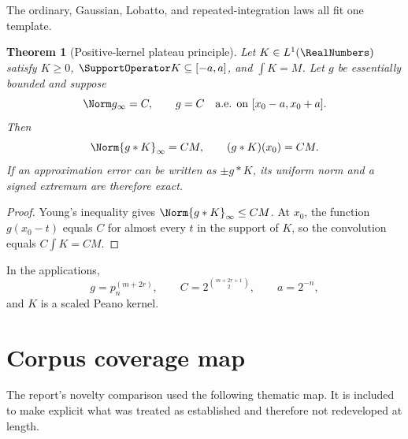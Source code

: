 \documentclass[11pt]{article}
\numberwithin{equation}{section}
\newtheorem{theorem}{Theorem}[section]
\theoremstyle{definition}
\theoremstyle{remark}
\begin{document}
The ordinary, Gaussian, Lobatto, and repeated-integration laws all fit one template.

\begin{theorem}[Positive-kernel plateau principle]
\label{p1:thm:abstract-plateau}
Let $K\in L^1(\RealNumbers)$ satisfy $K\ge0$, $\SupportOperator K\subseteq[-a,a]$, and $\int K=M$.  Let $g$ be essentially bounded and suppose
\[
 \Norm g_\infty=C,
 \qquad
 g=C\quad\text{a.e. on }[x_0-a,x_0+a].
\]
Then
\begin{equation}
 \Norm{g*K}_\infty=CM,
 \qquad
 (g*K)(x_0)=CM.
 \label{p1:eq:abstract-plateau}
\end{equation}
If an approximation error can be written as $\pm g*K$, its uniform norm and a signed extremum are therefore exact.
\end{theorem}

\begin{proof}
Young's inequality gives $\Norm{g*K}_\infty\le CM$.  At $x_0$, the function $g(x_0-t)$ equals $C$ for almost every $t$ in the support of $K$, so the convolution equals $C\int K=CM$.
\end{proof}

In the applications,
\[
 g=p_n^{(m+2r)},
 \qquad
 C=2^{\binom{m+2r+1}{2}},
 \qquad
 a=2^{-n},
\]
and $K$ is a scaled Peano kernel.

\section{Corpus coverage map}
\label{p1:app:coverage}

The report's novelty comparison used the following thematic map.  It is included to make explicit what was treated as established and therefore not redeveloped at length.
\end{document}
